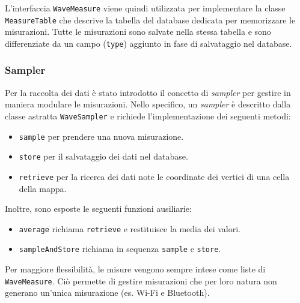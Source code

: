 \documentclass[11pt]{article}
\begin{document}
L'interfaccia \texttt{WaveMeasure} viene quindi utilizzata per implementare la classe \texttt{MeasureTable} che descrive la tabella del database dedicata per memorizzare le misurazioni. 
Tutte le misurazioni sono salvate nella stessa tabella e sono differenziate da un campo (\texttt{type}) aggiunto in fase di salvataggio nel database.


\subsubsection{Sampler}
Per la raccolta dei dati è stato introdotto il concetto di \textit{sampler} per gestire in maniera modulare le misurazioni.
Nello specifico, un \textit{sampler} è descritto dalla classe astratta \texttt{WaveSampler} e richiede l'implementazione dei seguenti metodi:
\begin{itemize}
    \item \texttt{sample} per prendere una nuova misurazione.
    \item \texttt{store} per il salvataggio dei dati nel database.
    \item \texttt{retrieve} per la ricerca dei dati note le coordinate dei vertici di una cella della mappa.
\end{itemize}
Inoltre, sono esposte le seguenti funzioni ausiliarie:
\begin{itemize}
    \item \texttt{average} richiama \texttt{retrieve} e restituisce la media dei valori.
    \item \texttt{sampleAndStore} richiama in sequenza \texttt{sample} e \texttt{store}.
\end{itemize}
Per maggiore flessibilità, le misure vengono sempre intese come liste di \texttt{WaveMeasure}. Ciò permette di gestire misurazioni che per loro natura non generano un'unica misurazione (es. Wi-Fi e Bluetooth).
\end{document}
